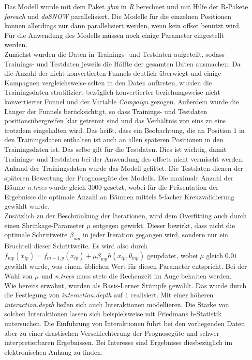 Das Modell wurde mit dem Paket \textit{gbm} \cite{gbm} in \textit{R} \cite{r} berechnet und mit Hilfe der R-Pakete \textit{foreach} \cite{foreach} und \textit{doSNOW} \cite{dosnow} parallelisiert. Die Modelle für die einzelnen Positionen können allerdings nur dann parallelisiert werden, wenn kein offset benützt wird. Für die Anwendung des Modells müssen noch einige Parameter eingestellt werden.\\
Zunächst wurden die Daten in Trainings- und Testdaten aufgeteilt, sodass Trainings- und Testdaten jeweils die Hälfte der gesamten Daten ausmachen. Da die Anzahl der nicht-konvertierten Funnels deutlich überwiegt und einige Kampagnen vergleichsweise selten in den Daten auftreten, wurden die Trainingsdaten stratifiziert bezüglich konvertierter beziehungsweise nicht-konvertierter Funnel und der Variable \textit{Campaign} gezogen. Außerdem wurde die Länger der Funnels berücksichtigt, so dass  Trainings- und Testdaten positionsübergreifen klar getrennt sind und das Verhältnis von eins zu eins trotzdem eingehalten wird. Das heißt, dass ein Beobachtung, die an Position $1$ in den Trainingsdaten enthalten ist auch an allen späteren Positionen in den Trainingsdaten ist. Das selbe gilt für die Testdaten. Dies ist wichtig, damit Trainings- und Testdaten bei der Anwendung des offsets nicht vermischt werden. Anhand der Trainingsdaten wurde das Modell gefittet. Die Testdaten dienen der späteren Bewertung der Prognosegüte des Modells. Die maximale Anzahl der Bäume \textit{n.trees} wurde gleich $3000$ gesetzt, wobei für die Präsentation der Ergebnisse die optimale Anzahl an Bäumen mittels 5-facher Kreuzvalidierung gewählt wurde.\\
Zusätzlich zu der Beschränkung der Iterationen, wird dem Overfitting auch durch einen Shrinkage-Parameter $\mu$ entgegen gewirkt. Dieser bewirkt, dass nicht die optimale Schrittweite $\beta_{mp}$ in jeder Iteration gegangen wird, sondern nur ein Bruchteil dieser Schrittweite. Es wird also durch $f_{mp}(x_{ip}) = f_{m-1,p}(x_{ip}) + \mu \beta_{mp} h(x_{ip},\theta_{mp})$ geupdatet, wobei $\mu$ gleich $0.01$ gewählt wurde, was einem üblichen Wert für diesen Parameter entspricht. Bei der Wahl von $\mu$ und \textit{n.trees} muss stets die Rechenzeit im Auge behalten werden.\\
Wie bereits erwähnt, wurden als Basis-Lerner Stümpfe gewählt. Das wurde durch die Festlegung von \textit{interaction.depth} auf $1$ realisiert. Mit einer höheren \textit{interaction.depth} ließen sich auch Interaktionen modellieren. Die Stärke von solchen Interaktionen lassen sich beispielsweise mit Friedmans h-Statistik \cite{friedman_h} untersuchen. Die Einführung von Interaktionen führt bei den vorliegenden Daten aber zu einer drastischen Verschlechterung der Prognosegüte und schwer interpretierbaren Ergebnissen. Bei Interesse sind Ergebnisse diesbezüglich im elektronischen Anhang zu finden.\\
